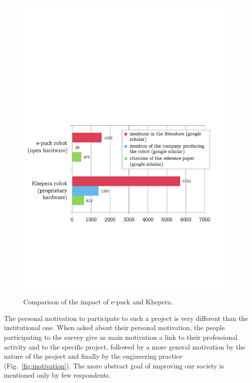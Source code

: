 \documentclass[letterpaper, 10 pt, conference]{ieeeconf}  %
\begin{document}
\begin{figure}
\centering
\includegraphics[width=\columnwidth]{figures/others_robots}
\caption{Comparison of the impact of e-puck and Khepera.
}
\label{fig:khepuck}
\end{figure}

The personal motivation to participate to such a project is very different than the institutional one. 
When asked about their personal motivation, the people participating to the survey give as main motivation a link to their professional activity and to the specific project, followed by a more general motivation by the nature of the project and finally by the engineering practice (Fig.~\ref{fig:motivation}). 
The more abstract goal of improving our society is mentioned only by few respondents.
\end{document}
